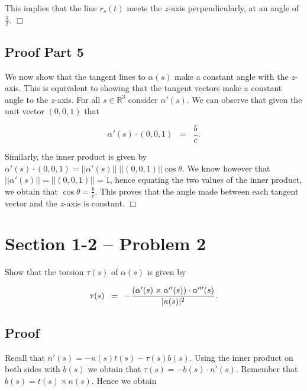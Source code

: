 \documentclass{article}
\begin{document}
\noindent This implies that the line $r_s(t)$ meets the $z$-axis perpendicularly, at an angle of $\frac{\pi}{2}$.  \hfill $\Box$

\subsection*{Proof Part 5}

\noindent We now show that the tangent lines to $\alpha(s)$ make a constant angle with the $z$-axis.  This is equivalent to showing that the tangent vectors make a constant angle to the $z$-axis.  For all $s \in \mathbb{R}^3$ consider $\alpha'(s)$.  We can observe that given the unit vector $(0,0,1)$ that 

\begin{equation*}
\alpha'(s) \cdot (0,0,1) \;\; = \;\; \frac{b}{c}.  
\end{equation*} 

\noindent Similarly, the inner product is given by $\alpha'(s) \cdot (0,0,1) = ||\alpha'(s)|| \; ||(0,0,1)|| \cos \theta$.  We know however that $||\alpha'(s)|| = ||(0,0,1)|| = 1$, hence equating the two values of the inner product, we obtain that $\cos\theta = \frac{b}{c}$.  This proves that the angle made between each tangent vector and the $z$-axis is constant.  \hfill $\Box$


\section*{Section 1-2 -- Problem 2}

\noindent Show that the torsion $\tau(s)$ of $\alpha(s)$ is given by 

\begin{equation*}
\tau(s) \;\; = \;\; - \frac{(\alpha'(s) \times \alpha''(s)) \cdot \alpha'''(s)}{|\kappa(s)|^2}. \\
\end{equation*}

\subsection*{Proof}

\noindent Recall that $n'(s) = -\kappa(s) t(s) - \tau(s) b(s)$.  Using the inner product on both sides with $b(s)$ we obtain that $\tau(s) = - b(s) \cdot n'(s)$.  Remember that $b(s) = t(s) \times n(s)$.  Hence we obtain
\end{document}
